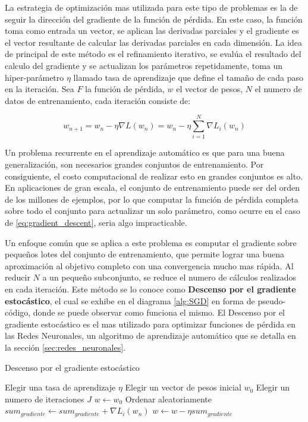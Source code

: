 \documentclass[a4paper,11pt,spanish]{book}
\begin{document}
      La estrategia de optimización mas utilizada para este tipo de problemas es la de seguir la dirección del gradiente de la función de pérdida.
      En este caso, la función toma como entrada un vector, se aplican las derivadas parciales y el gradiente es el vector resultante de calcular las derivadas parciales
      en cada dimensión.
      La idea de principal de este método es el refinamiento iterativo, se evalúa el resultado del calculo del gradiente y se actualizan los parámetros repetidamente,
      toma un hiper-parámetro $\eta$ llamado tasa de aprendizaje que define el tamaño de cada paso en la iteración.
      Sea $F$ la función de pérdida, $w$ el vector de pesos, $N$ el numero de datos de entrenamiento, cada iteración consiste de:

      \begin{equation}\label{eq:gradient_descent}
	w_{n+1} = w_n - \eta \nabla L(w_n)  = w_n - \eta \sum_{i=1}^{N} \nabla L_i(w_n)
      \end{equation}

      Un problema recurrente en el aprendizaje automático es que para una buena generalización, son necesarios grandes conjuntos de entrenamiento.
      Por consiguiente, el costo computacional de realizar esto en grandes conjuntos es alto.
      En aplicaciones de gran escala, el conjunto de entrenamiento puede ser del orden de los millones de ejemplos, por lo que computar la función de
      pérdida completa sobre todo el conjunto para actualizar un solo parámetro, como ocurre en el caso de \eqref{eq:gradient_descent}, seria algo impracticable.
      
      Un enfoque común que se aplica a este problema es computar el gradiente sobre pequeños lotes del conjunto de entrenamiento, que permite lograr una buena aproximación 
      al objetivo completo con una convergencia mucho mas rápida. 
      Al reducir $N$ a un pequeño subconjunto, se reduce el numero de cálculos realizados en cada iteración. 
      Este método se lo conoce como \textbf{Descenso por el gradiente estocástico}, el cual se exhibe en el diagrama \ref{alg:SGD} en forma de pseudo-código, 
      donde se puede observar como funciona el mismo. 
      El Descenso por el gradiente estocástico  es el mas utilizado para optimizar funciones de pérdida en las Redes Neuronales, un algoritmo de aprendizaje
      automático que se detalla en la sección \ref{sec:redes_neuronales}.

	\begin{algorithm}[ht]
	  \caption{Descenso por el gradiente estocástico}
	  \label{alg:SGD}
	  \begin{algorithmic}
	    \State Elegir una tasa de aprendizaje $\eta$
	    \State Elegir un vector de pesos inicial $w_0$
	    \State Elegir un numero de iteraciones $J$
	    \State $w \gets w_0$
	      \State Ordenar aleatoriamente
		$sum_{gradiente} \gets sum_{gradiente} + \nabla L_i(w_n)$
	      \EndFor
	      \State $w \gets w - \eta sum_{gradiente}$
	    \EndFor
	  \end{algorithmic}
	\end{algorithm}
\iffalse
\end{document}
